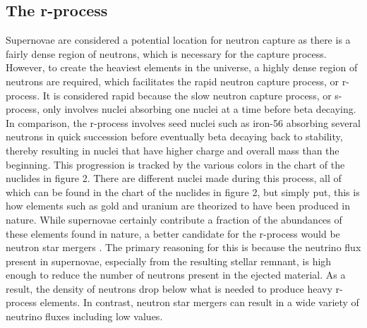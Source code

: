 \documentclass[11pt,a4paper]{article}
\begin{document}
\subsection{The r-process}

Supernovae are considered a potential location for neutron capture as there is a fairly dense region of neutrons, which is necessary for the capture process. However, to create the heaviest elements in the universe, a highly dense region of neutrons are required, which facilitates the rapid neutron capture process, or r-process. It is considered rapid because the slow neutron capture process, or s-process, only involves nuclei absorbing one nuclei at a time before beta decaying. In comparison, the r-process involves seed nuclei such as iron-56 absorbing several neutrons in quick succession before eventually beta decaying back to stability, thereby resulting in nuclei that have higher charge and overall mass than the beginning. This progression is tracked by the various colors in the chart of the nuclides in figure 2. There are different nuclei made during this process, all of which can be found in the chart of the nuclides in figure 2, but simply put, this is how elements such as gold and uranium are theorized to have been produced in nature. While supernovae certainly contribute a fraction of the abundances of these elements found in nature, a better candidate for the r-process would be neutron star mergers \cite{Cowan_2021} . The primary reasoning for this is because the neutrino flux present in supernovae, especially from the resulting stellar remnant, is high enough to reduce the number of neutrons present in the ejected material. As a result, the density of neutrons drop below what is needed to produce heavy r-process elements. In contrast, neutron star mergers can result in a wide variety of neutrino fluxes including low values.
\end{document}
